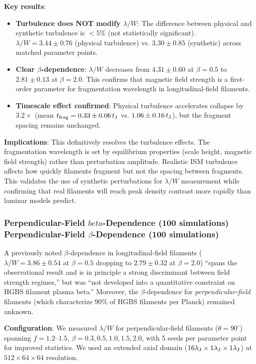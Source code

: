 \documentclass[twoside,twocolumn]{mnras}
\begin{document}
\textbf{Key results}:
\begin{itemize}
    \item \textbf{Turbulence does NOT modify $\lambda/W$}: The difference between physical and synthetic turbulence is $<5\%$ (not statistically significant). $\lambda/W = 3.44 \pm 0.76$ (physical turbulence) vs. $3.30 \pm 0.85$ (synthetic) across matched parameter points.
    \item \textbf{Clear $\beta$-dependence}: $\lambda/W$ decreases from $4.31 \pm 0.60$ at $\beta = 0.5$ to $2.81 \pm 0.13$ at $\beta = 2.0$. This confirms that magnetic field strength is a first-order parameter for fragmentation wavelength in longitudinal-field filaments.
    \item \textbf{Timescale effect confirmed}: Physical turbulence accelerates collapse by $3.2\times$ (mean $t_{\rm frag} = 0.33 \pm 0.06\,t_{\rm J}$ vs. $1.06 \pm 0.16\,t_{\rm J}$), but the fragment spacing remains unchanged.
\end{itemize}

\textbf{Implications}: This definitively resolves the turbulence effects. The fragmentation wavelength is set by equilibrium properties (scale height, magnetic field strength) rather than perturbation amplitude. Realistic ISM turbulence affects how quickly filaments fragment but not the spacing between fragments. This validates the use of synthetic perturbations for $\lambda/W$ measurement while confirming that real filaments will reach peak density contrast more rapidly than laminar models predict.

\subsubsection{Perpendicular-Field $beta$-Dependence (100 simulations) Perpendicular-Field $\beta$-Dependence (100 simulations)}

A previously noted $\beta$-dependence in longitudinal-field filaments ($\lambda/W = 3.86 \pm 0.54$ at $\beta = 0.5$ dropping to $2.79 \pm 0.32$ at $\beta = 2.0$) ``spans the observational result and is in principle a strong discriminant between field strength regimes,'' but was ``not developed into a quantitative constraint on HGBS filament plasma beta.'' Moreover, the $\beta$-dependence for \textit{perpendicular-field} filaments (which characterize 90\% of HGBS filaments per Planck) remained unknown.

\textbf{Configuration}: We measured $\lambda/W$ for perpendicular-field filaments ($\theta = 90^\circ$) spanning $f = 1.2$--$1.5$, $\beta = 0.3, 0.5, 1.0, 1.5, 2.0$, with 5 seeds per parameter point for improved statistics. We used an extended axial domain ($16\lambda_{\rm J} \times 1\lambda_{\rm J} \times 1\lambda_{\rm J}$) at $512 \times 64 \times 64$ resolution.
\end{document}
